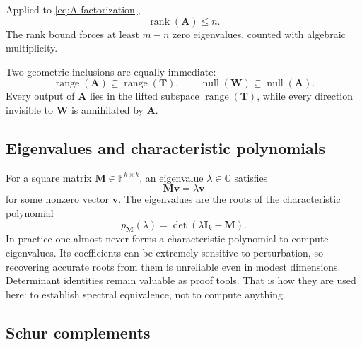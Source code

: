 \documentclass[11pt]{article}
\newcommand{\F}{\mathbb{F}}
\newcommand{\C}{\mathbb{C}}
\newcommand{\I}{\mathbf{I}}
\newcommand{\mat}[1]{\mathbf{#1}}
\newcommand{\vect}[1]{\mathbf{#1}}
\newcommand{\rank}{\operatorname{rank}}
\newcommand{\range}{\operatorname{range}}
\newcommand{\nullsp}{\operatorname{null}}
\theoremstyle{definition}
\theoremstyle{remark}
\begin{document}
Applied to \cref{eq:A-factorization},
\begin{equation}
  \rank(\mat{A})\leq n.
  \label{eq:rank-A}
\end{equation}
The rank bound forces at least \(m-n\) zero eigenvalues, counted with algebraic multiplicity.

Two geometric inclusions are equally immediate:
\begin{equation}
  \range(\mat{A})\subseteq \range(\mat{T}),
  \qquad
  \nullsp(\mat{W})\subseteq \nullsp(\mat{A}).
  \label{eq:range-null-inclusions}
\end{equation}
Every output of \(\mat{A}\) lies in the lifted subspace \(\range(\mat{T})\), while every direction invisible to \(\mat{W}\) is annihilated by \(\mat{A}\).

\subsection{Eigenvalues and characteristic polynomials}

For a square matrix \(\mat{M}\in\F^{k\times k}\), an eigenvalue \(\lambda\in\C\) satisfies
\[
  \mat{M}\vect{v}=\lambda\vect{v}
\]
for some nonzero vector \(\vect{v}\). The eigenvalues are the roots of the characteristic polynomial
\begin{equation}
  p_{\mat{M}}(\lambda)
  =\det(\lambda\I_k-\mat{M}).
  \label{eq:characteristic-polynomial}
\end{equation}
In practice one almost never forms a characteristic polynomial to compute eigenvalues. Its coefficients can be extremely sensitive to perturbation, so recovering accurate roots from them is unreliable even in modest dimensions. Determinant identities remain valuable as proof tools. That is how they are used here: to establish spectral equivalence, not to compute anything.

\subsection{Schur complements}
\end{document}
